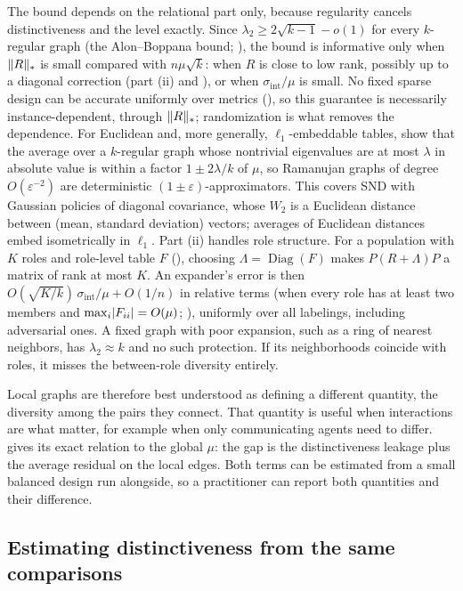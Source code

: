 \documentclass[twoside,11pt]{article}
\DeclarePairedDelimiter{\abs}{\lvert}{\rvert}
\DeclarePairedDelimiter{\norm}{\lVert}{\rVert}
\begin{document}
The bound depends on the relational part only, because regularity cancels
distinctiveness and the level exactly.
Since $\lambda_2\ge2\sqrt{k-1}-o(1)$ for every $k$-regular graph (the
Alon--Boppana bound; \citealp{hoory2006expander}), the bound is
informative only when $\norm{R}_*$ is small compared with $n\mu\sqrt{k}$: when
$R$ is close to low rank, possibly up to a diagonal correction (part (ii) and
), or when $\sigma_{\mathrm{int}}/\mu$ is small. No fixed
sparse design can be accurate uniformly over metrics
(), so this guarantee is necessarily instance-dependent,
through $\norm{R}_*$; randomization is what removes the dependence. For
Euclidean and, more generally, $\ell_1$-embeddable tables,
\citet{barhum2007approximating} show that the average over a $k$-regular
graph whose nontrivial eigenvalues are at most $\lambda$ in absolute value
is within a factor $1\pm2\lambda/k$ of $\mu$, so Ramanujan graphs of degree
$O(\varepsilon^{-2})$ are deterministic $(1\pm\varepsilon)$-approximators.
This covers SND with Gaussian policies of diagonal covariance, whose $W_2$
is a Euclidean distance between (mean, standard deviation) vectors; averages
of Euclidean distances embed isometrically in $\ell_1$. Part (ii) handles role structure.
For a population with $K$ roles and role-level table $F$ (), choosing $\Lambda=\operatorname{Diag}(F)$
makes $P(R+\Lambda)P$ a matrix of rank at most $K$. An expander's error is
then $O(\sqrt{K/k})\,\sigma_{\mathrm{int}}/\mu+O(1/n)$ in relative terms
(when every role has at least two members and $\max_i\abs{F_{ii}}=O(\mu)$;
),
uniformly over all labelings, including adversarial ones. A fixed graph with poor expansion, such as a ring of
nearest neighbors, has $\lambda_2\approx k$ and no such protection. If its
neighborhoods coincide with roles, it misses the between-role diversity
entirely.

Local graphs are therefore best understood as defining a different
quantity, the diversity among the pairs they connect. That quantity is
useful when interactions are what matter, for example when only
communicating agents need to differ.  gives its
exact relation to the global $\mu$: the gap is the distinctiveness leakage
plus the average residual on the local edges. Both terms can be estimated
from a small balanced design run alongside, so a practitioner can report
both quantities and their difference.

\subsection{Estimating distinctiveness from the same comparisons}
\label{sec:sparse-anatomy}
\end{document}
